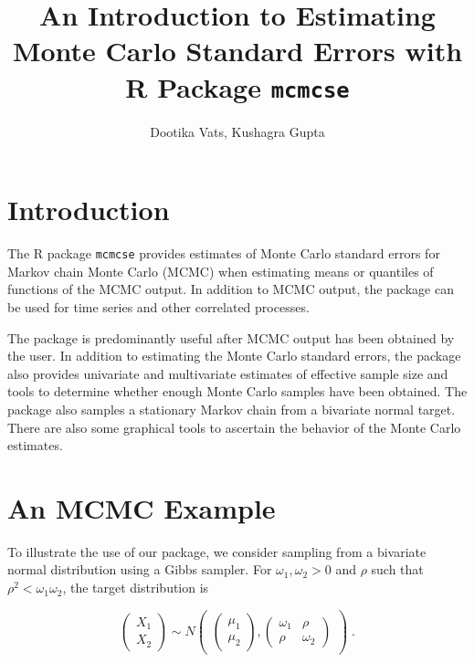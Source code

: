 \documentclass[11pt]{article}
\title{An Introduction to Estimating Monte Carlo Standard Errors with R Package \texttt{mcmcse} }
\author{Dootika Vats, Kushagra Gupta}
\begin{document}



\maketitle
\setlength\parindent{0pt}
\tableofcontents

\break
\section{Introduction}
The R package \texttt{mcmcse} provides estimates of Monte Carlo standard errors for Markov chain Monte Carlo (MCMC) when estimating means or quantiles of functions of the MCMC output. In addition to MCMC output, the package can be used for time series and other correlated processes. 

The package is predominantly useful after MCMC output has been obtained by the user. In addition to estimating the Monte Carlo standard errors, the package also provides univariate and multivariate estimates of effective sample size and tools to determine whether enough Monte Carlo samples have been obtained. The package also samples a stationary Markov chain from a bivariate normal target. There are also some graphical tools to ascertain the behavior of the Monte Carlo estimates.



\bigskip
\section{An MCMC Example}

To illustrate the use of our package, we consider sampling from a bivariate normal distribution using a Gibbs sampler. For $\omega_1, \omega_2 > 0$ and  $\rho$ such that $\rho^2 < \omega_1 \omega_2$, the target distribution is 

\[
\left(\begin{array}{c}
  X_1 \\ X_2
\end{array} \right) \sim 
 N \begin{pmatrix}
\begin{pmatrix}
\mu_{1}\\
\mu_{2}
\end{pmatrix}, 
\begin{pmatrix}
\omega_1 & \rho \\
\rho & \omega_2
\end{pmatrix}
\end{pmatrix} \; .
\]
\end{document}
